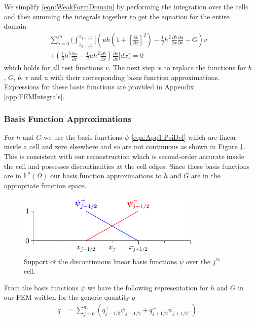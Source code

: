 We simplify \eqref{eqn:WeakFormDomain} by performing the integration over the cells and then summing the integrals together to get the equation for the entire domain
\begin{multline}
\label{eq:elementwiseint}
 \sum_{j=0}^m \Bigg(  \int_{x_{j-1/2} }^{{x_{j+1/2}}} \Bigg[  \left( uh \left(1 + \left[\frac{\partial b}{\partial x}\right]^2 \right)  - \frac{1}{2}h^2\frac{\partial b}{\partial x}  \frac{\partial u }{\partial x}  -  G \right) v   \\ +  \left(\frac{1}{3}h^3  \frac{\partial {u}}{\partial x}    -     \frac{1}{2} uh^2\frac{\partial b}{\partial x}    \right) \frac{\partial v }{\partial x} \Bigg]dx \Bigg)  = 0
\end{multline}
which holds for all test functions $v$. The next step is to replace the functions for $h$, $G$, $b$, $v$ and $u$ with their corresponding basis function approximations. Expressions for these basis functions are provided in Appendix \ref{app:FEMIntegrals}.

\subsubsection{Basis Function Approximations}
For $h$ and $G$ we use the basis functions $\psi$ \eqref{eqn:App1:PsiDef} which are linear inside a cell and zero elsewhere and so are not continuous as shown in Figure \ref{fig:P1DiscBasis}. This is consistent with our reconstruction which is second-order accurate inside the cell and possesses discontinuities at the cell edges. Since these basis functions are in $\mathbb{L}^2(\Omega)$ our basis function approximations to $h$ and $G$ are in the appropriate function space.
\begin{figure}
	\centering
	\includegraphics[width=0.8\textwidth]{./chp3/figures/P1.pdf}
	\caption{Support of the discontinuous linear basis functions $\psi$ over the $j^{th}$ cell.}
	\label{fig:P1DiscBasis}
\end{figure}

From the basis functions $\psi$ we have the following representation for $h$ and $G$ in our FEM written for the generic quantity $q$
\begin{align}
\label{eqn:FEapproxtohG}
q &= \sum_{j=0}^m \left( q^+_{j-1/2}\psi^+_{j-1/2}  + q^-_{j+1/2}\psi^-_{j+1/2}, \right).
\end{align}

